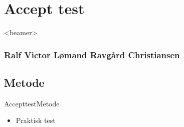 

\section{Accept test}
\begin{frame}<beamer>
\frametitle{Ralf Victor Lømand Ravgård Christiansen}
\tableofcontents[currentsection]
\end{frame}

\subsection{Metode}
\begin{frame}{Accepttest}{Metode}
\begin{itemize}
	\item<1-> Praktisk test
\end{itemize}
\begin{figure}[H]
  \centering
   \scalebox{0.75}{}
\end{figure}

\end{frame}

